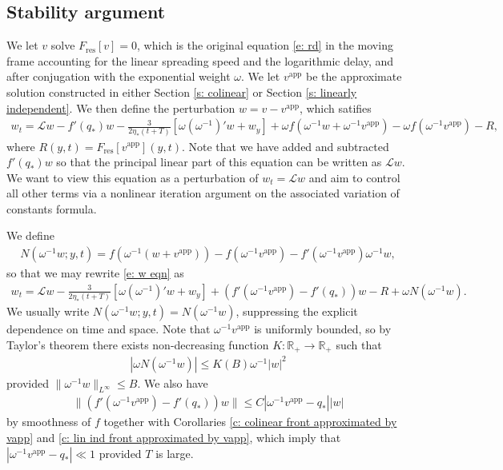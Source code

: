 \documentclass[11pt]{article}
\newcommand{\R}{\mathbb{R}}
\newcommand{\mcl}{\mathcal{L}}
\numberwithin{equation}{section}
\numberwithin{prop}{section}
\begin{document}
\subsection{Stability argument}
We let $v$ solve $F_\mathrm{res} [v] = 0$, which is the original equation \eqref{e: rd} in the moving frame accounting for the linear spreading speed and the logarithmic delay, and after conjugation with the exponential weight $\omega$. We let $v^\mathrm{app}$ be the approximate solution constructed in either Section \ref{s: colinear} or Section \ref{s: linearly independent}. We then define the perturbation $w = v - v^\mathrm{app}$, which satifies
\begin{multline}
	w_t = \mcl w - f'(q_*) w - \frac{3}{2 \eta_* (t+T)} [ \omega (\omega^{-1})' w + w_y] + \omega f(\omega^{-1} w + \omega^{-1} v^\mathrm{app}) - \omega f(\omega^{-1} v^\mathrm{app}) - R, \label{e: w eqn}
\end{multline}
where $R(y,t) = F_\mathrm{res}[v^\mathrm{app}](y,t)$. Note that we have added and subtracted $f'(q_*)w$ so that the principal linear part of this equation can be written as $\mcl w$. We want to view this equation as a perturbation of $w_t = \mcl w$ and aim to control all other terms via a nonlinear iteration argument on the associated variation of constants formula. 

We define
\begin{align}
N(\omega^{-1} w; y, t) = f(\omega^{-1} (w + v^\mathrm{app})) - f(\omega^{-1} v^\mathrm{app}) - f'(\omega^{-1} v^\mathrm{app}) \omega^{-1} w, 
\end{align}
so that we may rewrite \eqref{e: w eqn} as 
\begin{align}
w_t = \mcl w -  \frac{3}{2 \eta_* (t+T)} [ \omega (\omega^{-1})' w + w_y] + (f'(\omega^{-1} v^\mathrm{app}) - f'(q_*)) w - R + \omega N(\omega^{-1} w). \label{e: w eqn rewritten}
\end{align}
We usually write $N(\omega^{-1} w; y, t) = N(\omega^{-1} w)$, suppressing the explicit dependence on time and space. Note that $\omega^{-1} v^\mathrm{app}$ is uniformly bounded, so by Taylor's theorem there exists non-decreasing function $K: \R_+ \to \R_+$ such that 
\begin{align}
|\omega N(\omega^{-1} w)| \leq K(B) \omega^{-1} | w|^2 \label{e: nonlinearity Taylors thm}
\end{align}
provided $\|\omega^{-1} w\|_{L^\infty} \leq B.$ 
We also have
\begin{align}
\| (f'(\omega^{-1} v^\mathrm{app}) - f'(q_*)) w \| \leq C | \omega^{-1} v^\mathrm{app}-q_* | |w|
\end{align}
by smoothness of $f$ together with Corollaries \ref{c: colinear front approximated by vapp} and \ref{c: lin ind front approximated by vapp}, which imply that $| \omega^{-1} v^\mathrm{app} - q_*| \ll 1$ provided $T$ is large. 
\end{document}
